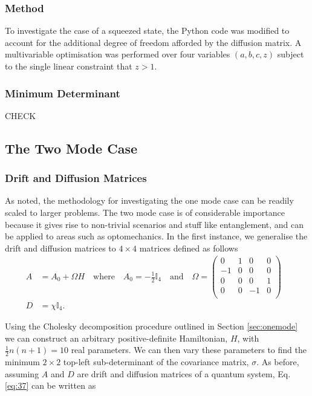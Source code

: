 \documentclass[11pt,a4paper]{article}
\numberwithin{equation}{section}
\begin{document}
	\subsubsection{Method}\color{black}
	
	To investigate the case of a squeezed state, the Python code was modified to account for the additional degree of freedom afforded by the diffusion matrix. A multivariable optimisation was performed over four variables $(a, b, c, z)$ subject to the single linear constraint that $z>1$.
	
	\subsubsection{Minimum Determinant}
	CHECK
	\fi 
	
	\subsection{The Two Mode Case}
	\subsubsection{Drift and Diffusion Matrices}
	As noted, the methodology for investigating the one mode case can be readily scaled to larger problems. The two mode case is of considerable importance because it gives rise to non-trivial scenarios and stuff like entanglement, and can be applied to areas such as optomechanics. In the first instance, we generalise the drift and diffusion matrices to $4 \times 4$ matrices defined as follows
	\begin{align*}
	A &= A_0 + \Omega H \quad\text{where}\quad A_0 = -\frac{1}{2}\mathbb{I}_4\quad\text{and}\quad \Omega = \begin{pmatrix}
	0 & 1 & 0 & 0 \\
	-1 & 0 & 0 & 0\\
	0 & 0 & 0 & 1\\
	0 & 0 & -1 & 0\\
	\end{pmatrix} &\\
	D &= \chi \mathbb{I}_4 .&
	\end{align*}
	
	Using the Cholesky decomposition procedure outlined in Section \ref{sec:onemode} we can construct an arbitrary positive-definite Hamiltonian, $H$, with $\frac{1}{2}n(n+1)=10$ real parameters. We can then vary these parameters to find the minimum $2 \times 2$ top-left sub-determinant of the covariance matrix, $\sigma$. As before, assuming $A$ and $D$ are drift and diffusion matrices of a quantum system, Eq. \ref{eq:37} can be written as 
\end{document}
